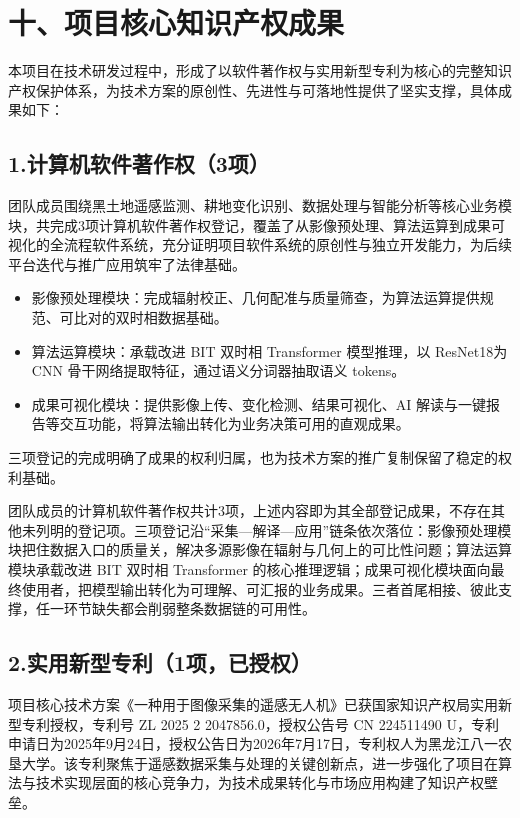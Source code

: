 \documentclass[12pt, a4paper]{ctexart}
\begin{document}
\section{十、项目核心知识产权成果}

本项目在技术研发过程中，形成了以软件著作权与实用新型专利为核心的完整知识产权保护体系，为技术方案的原创性、先进性与可落地性提供了坚实支撑，具体成果如下：

\subsection{1.计算机软件著作权（3项）}

团队成员围绕黑土地遥感监测、耕地变化识别、数据处理与智能分析等核心业务模块，共完成3项计算机软件著作权登记，覆盖了从影像预处理、算法运算到成果可视化的全流程软件系统，充分证明项目软件系统的原创性与独立开发能力，为后续平台迭代与推广应用筑牢了法律基础。

\begin{itemize}
    \item 影像预处理模块：完成辐射校正、几何配准与质量筛查，为算法运算提供规范、可比对的双时相数据基础。
    \item 算法运算模块：承载改进 BIT 双时相 Transformer 模型推理，以 ResNet18为 CNN 骨干网络提取特征，通过语义分词器抽取语义 tokens。
    \item 成果可视化模块：提供影像上传、变化检测、结果可视化、AI 解读与一键报告等交互功能，将算法输出转化为业务决策可用的直观成果。
\end{itemize}

三项登记的完成明确了成果的权利归属，也为技术方案的推广复制保留了稳定的权利基础。

团队成员的计算机软件著作权共计3项，上述内容即为其全部登记成果，不存在其他未列明的登记项。三项登记沿“采集—解译—应用”链条依次落位：影像预处理模块把住数据入口的质量关，解决多源影像在辐射与几何上的可比性问题；算法运算模块承载改进 BIT 双时相 Transformer 的核心推理逻辑；成果可视化模块面向最终使用者，把模型输出转化为可理解、可汇报的业务成果。三者首尾相接、彼此支撑，任一环节缺失都会削弱整条数据链的可用性。

\subsection{2.实用新型专利（1项，已授权）}

项目核心技术方案《一种用于图像采集的遥感无人机》已获国家知识产权局实用新型专利授权，专利号 ZL 2025 2 2047856.0，授权公告号 CN 224511490 U，专利申请日为2025年9月24日，授权公告日为2026年7月17日，专利权人为黑龙江八一农垦大学。该专利聚焦于遥感数据采集与处理的关键创新点，进一步强化了项目在算法与技术实现层面的核心竞争力，为技术成果转化与市场应用构建了知识产权壁垒。
\end{document}
